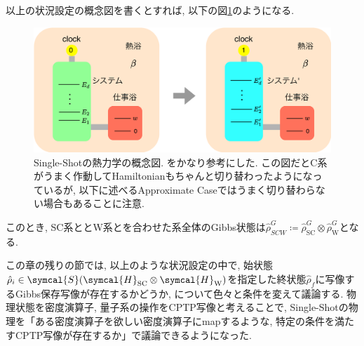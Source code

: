 以上の状況設定の概念図を書くとすれば, 以下の図\ref{fig:Single-Shot_quantumtherm}のようになる. 

\begin{figure}[H]
  \centering
  \includegraphics[keepaspectratio, scale=0.04]{images/Single-Shot_quantumthermo.drawio.png}
  \caption{Single-Shotの熱力学の概念図. 
  \cite{PhysLabResource}をかなり参考にした. 
  この図だとC系がうまく作動してHamiltonianもちゃんと切り替わったようになっているが, 以下に述べるApproximate Caseではうまく切り替わらない場合もあることに注意. }
  \label{fig:Single-Shot_quantumtherm}
\end{figure}

このとき, SC系ととW系とを合わせた系全体のGibbs状態は$\hat{\rho}_{SCW}^G\coloneqq\hat{\rho}_{\text{SC}}^G\otimes\hat{\rho}_{\text{W}}^G$となる. 

この章の残りの節では, 以上のような状況設定の中で, 始状態$\hat{\rho}_i\in\symcal{S}(\symcal{H}_{\text{SC}}\otimes\symcal{H}_{\text{W}})$を指定した終状態$\hat{\rho}_{f}$に写像するGibbs保存写像が存在するかどうか, について色々と条件を変えて議論する. 
物理状態を密度演算子, 量子系の操作をCPTP写像と考えることで, Single-Shotの物理を「ある密度演算子を欲しい密度演算子にmapするような, 特定の条件を満たすCPTP写像が存在するか」で議論できるようになった. 


